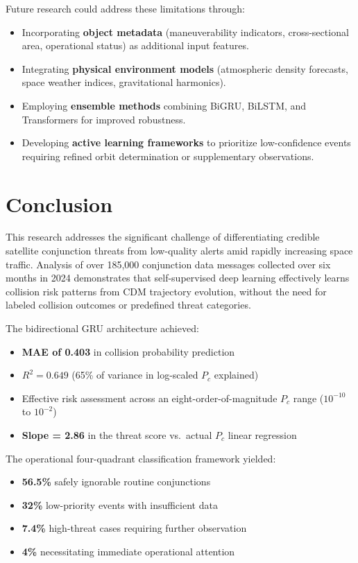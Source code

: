 \documentclass[12pt, a4paper]{article}
\begin{document}
Future research could address these limitations through:
\begin{itemize}
    \item Incorporating \textbf{object metadata} (maneuverability indicators, cross-sectional area, operational status) as additional input features.
    \item Integrating \textbf{physical environment models} (atmospheric density forecasts, space weather indices, gravitational harmonics).
    \item Employing \textbf{ensemble methods} combining BiGRU, BiLSTM, and Transformers for improved robustness.
    \item Developing \textbf{active learning frameworks} to prioritize low-confidence events requiring refined orbit determination or supplementary observations.
\end{itemize}

\section{Conclusion}

This research addresses the significant challenge of differentiating credible satellite conjunction threats from low-quality alerts amid rapidly increasing space traffic. Analysis of over 185,000 conjunction data messages collected over six months in 2024 demonstrates that self-supervised deep learning effectively learns collision risk patterns from CDM trajectory evolution, without the need for labeled collision outcomes or predefined threat categories.

The bidirectional GRU architecture achieved:
\begin{itemize}
    \item \textbf{MAE of 0.403} in collision probability prediction
    \item \textbf{$R^2 = 0.649$} (65\% of variance in log-scaled $P_c$ explained)
    \item Effective risk assessment across an eight-order-of-magnitude $P_c$ range ($10^{-10}$ to $10^{-2}$)
    \item \textbf{Slope = 2.86} in the threat score vs.\ actual $P_c$ linear regression
\end{itemize}

The operational four-quadrant classification framework yielded:
\begin{itemize}
    \item \textbf{56.5\%} safely ignorable routine conjunctions
    \item \textbf{32\%} low-priority events with insufficient data
    \item \textbf{7.4\%} high-threat cases requiring further observation
    \item \textbf{4\%} necessitating immediate operational attention
\end{itemize}
\end{document}
